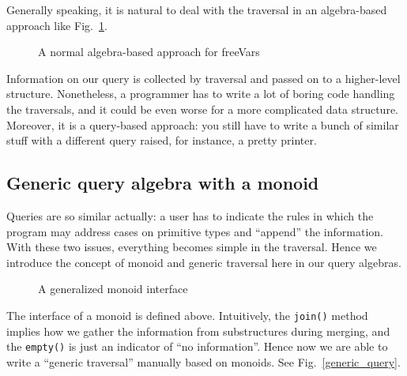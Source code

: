 Generally speaking, it is natural to deal with the traversal in an algebra-based approach like Fig.~\ref{freevars_without_monoid}.

\begin{figure}[tb]
\vspace{-.1in}
\caption{A normal algebra-based approach for freeVars}
\label{freevars_without_monoid}
\end{figure}
\begin{comment}
\bruno{put code in a figure, add a caption and refer
  to the figure in the text.}
\end{comment}

Information on our query is collected by traversal and passed on to a
higher-level structure. Nonetheless, a programmer has to write a lot
of boring code handling the traversals, and it could be even worse for
a more complicated data structure. Moreover, it is a query-based
approach: you still have to write a bunch of similar stuff with a
different query raised, for instance, a pretty printer.

\subsection{Generic query algebra with a monoid}\label{subsec:genericquery}

Queries are so similar actually: a user has to indicate the rules in
which the program may address cases on primitive types and ``append''
the information. With these two issues, everything becomes simple in
the traversal. Hence we introduce the concept of monoid and generic
traversal here in our query algebras.

\begin{figure}[!htbp]
\vspace{-.1in}
\caption{A generalized monoid interface}
\label{monoid}
\end{figure}

The interface of a monoid is defined above. Intuitively, the \lstinline{join()}
method implies how we gather the information from substructures during
merging, and the \lstinline{empty()} is just an indicator of ``no
information''. Hence now we are able to write a ``generic traversal''
manually based on monoids. See Fig.~\ref{generic_query}.
\begin{comment}
\bruno{As you can see, nothing
  follows! Please refer to the figure instead and briefly explain the
  code in the figure.}
\end{comment}


